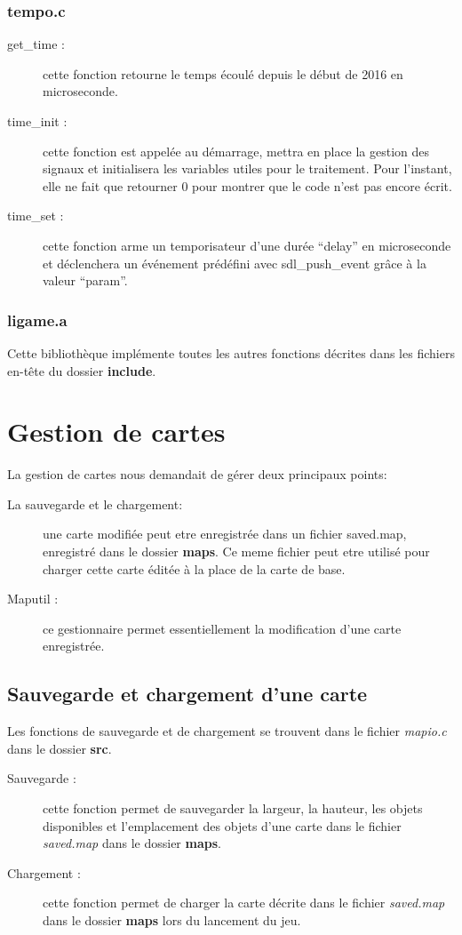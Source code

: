 \documentclass{report}
\begin{document}
\subsection{tempo.c}
\begin{description}
\item[get\_time :] cette fonction retourne le temps écoulé depuis le début de 2016 en microseconde.
\item[time\_init :] cette fonction est appelée au démarrage, mettra en place la gestion des signaux et initialisera les variables utiles pour le traitement. Pour l'instant, elle ne fait que retourner 0 pour montrer que le code n'est pas encore écrit.
\item[time\_set :] cette fonction arme un temporisateur d'une durée ``delay'' en microseconde et déclenchera un événement prédéfini avec sdl\_push\_event grâce à la valeur ``param''.
\end{description}

\subsection{ligame.a}
Cette bibliothèque implémente toutes les autres fonctions décrites dans les fichiers en-tête du dossier \textbf{include}.


\chapter{Gestion de cartes}
\setcounter{section}{0}
La gestion de cartes nous demandait de gérer deux principaux points:
\begin{description}
\item[La sauvegarde et le chargement:] une carte modifiée peut etre enregistrée dans un fichier saved.map, enregistré dans le dossier \textbf{maps}. Ce meme fichier peut etre utilisé pour charger cette carte éditée à la place de la carte de base.
\item[Maputil :] ce gestionnaire permet essentiellement la modification d'une carte enregistrée.
\end{description}

\section{Sauvegarde et chargement d'une carte}
Les fonctions de sauvegarde et de chargement se trouvent dans le fichier \textit{mapio.c} dans le dossier \textbf{src}.
\begin{description}
\item[Sauvegarde :] cette fonction permet de sauvegarder la largeur, la hauteur, les objets disponibles et l'emplacement des objets d'une carte dans le fichier \textit{saved.map} dans le dossier \textbf{maps}.
  \item[Chargement :] cette fonction permet de charger la carte décrite dans le fichier \textit{saved.map} dans le dossier \textbf{maps} lors du lancement du jeu.
\end{description}
\end{document}
